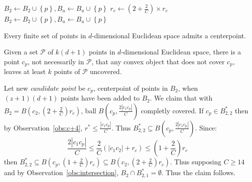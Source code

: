 \documentclass[envcountsame]{cls/cccg15}
\newcommand{\set}[1]{\left\{ #1 \right\}}
\newcommand{\card}[1]{\left|{#1}\right|}
\newcommand{\lee}{\leqslant}
\newcommand{\gee}{\geqslant}
\renewcommand{\leq}{\lee}
\renewcommand{\le}{\lee}
\renewcommand{\ge}{\gee}
\begin{document}
\begin{algorithmic}
		\State $B_2 \gets B_2 \cup \set{p}, B_u \gets B_u \cup \set{p}$
		\If{$\card{B_2} = (d+1)(z+1)$}
			\State $r_c \gets  (2 + \frac{2}{C}) \times r_c$
					\State $B_2 \gets B_2 \cup \set{p}, B_u \gets B_u \cup \set{p}$
				\EndIf
			\EndFor
		\EndIf
		\State {}
	\Else
		\State {}
	\EndIf
\EndFunction
\end{algorithmic}



\begin{prop}
Every finite set of points in $d$-dimensional Euclidean space admits a centerpoint.\cite{edelsbrunner1987algorithms}
\end{prop}

\begin{cor}
\label{cor:omitting-centerpoint}
Given a set $\mathcal{P}$ of $k(d+1)$ points in $d$-dimensional Euclidean space, there is a point $c_p$, not necessarily in $\mathcal{P}$, that any convex object that does not cover $c_p$, leaves at least $k$ points of $\mathcal{P}$ uncovered.
\end{cor}

Let new \emph{candidate point} be $c_p$, centerpoint of points in $B_2$, when $(z+1)(d+1)$ points have been added to $B_2$. We claim that with $B_2 = B(c_2, (2 + \frac{2}{C})r_c)$, ball $B(c_p, \frac{2\card{c_1c_p}}{C})$ completly covered.
If $c_p \in B_{2,2}^*$ then by Observation~\ref{obs:c+4}, $r^* \le \frac{\card{c_1c_p}}{C}$. Thus $B_{2,2}^* \subseteq B(c_p, \frac{2\card{c_1c_p}}{C})$.
Since:
\[
\frac{2\card{c_1c_p}}{C} \leq \frac{2}{C}(\card{c_1c_2} + r_c) \leq (1 + \frac{2}{C})r_c
\]
 then $B_{2,2}^* \subseteq B(c_p, (1 + \frac{2}{C})r_c) \subseteq B(c_2, (2 + \frac{2}{C})r_c)$. Thus supposing $C \ge 14$ and by Observation~\ref{obs:intersection}, $B_2 \cap B_{2,1}^* = \emptyset$. Thus the claim follows.
\end{document}
